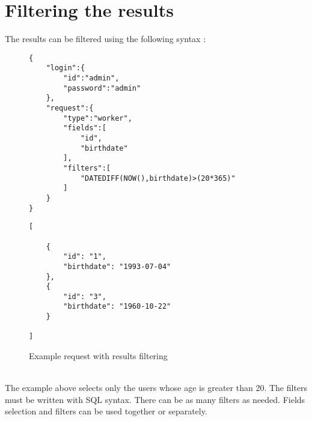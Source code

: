 \documentclass[notitlepage]{report}
\begin{document}
\section{Filtering the results}
The results can be filtered using the following syntax :
\begin{figure}[h]
\centering
\begin{minipage}{.45\linewidth}
\begin{verbatim}
{
	"login":{	
		"id":"admin",
		"password":"admin"
	},
	"request":{
		"type":"worker",
		"fields":[
			"id",
			"birthdate"
		],
		"filters":[
			"DATEDIFF(NOW(),birthdate)>(20*365)"
		]
	}
}
\end{verbatim}
\end{minipage}
\begin{minipage}{.45\linewidth}
\begin{verbatim}
[

    {
        "id": "1",
        "birthdate": "1993-07-04"
    },
    {
        "id": "3",
        "birthdate": "1960-10-22"
    }

]
\end{verbatim}
\end{minipage}
\caption{Example request with results filtering}
\end{figure}
\\
The example above selects only the users whose age is greater than 20. The filters must be written with SQL syntax. There can be as many filters as needed. Fields selection and filters can be used together or separately.

\newpage
\end{document}
